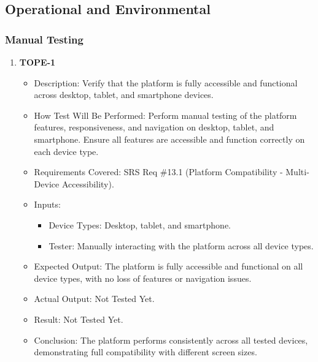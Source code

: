\documentclass[12pt, titlepage]{article}
\begin{document}
\subsection{Operational and Environmental}
\subsubsection{Manual Testing}
\begin{enumerate}
    \item \textbf{TOPE-1}  
    \begin{itemize}
        \item Description: Verify that the platform is fully accessible and functional across desktop, tablet, and smartphone devices.
        \item How Test Will Be Performed: Perform manual testing of the platform features, responsiveness, and navigation on desktop, tablet, and smartphone. Ensure all features are accessible and function correctly on each device type.
        \item Requirements Covered: SRS Req \#13.1 (Platform Compatibility - Multi-Device Accessibility).
        \item Inputs:  
            \begin{itemize}
                \item Device Types: Desktop, tablet, and smartphone.
                \item Tester: Manually interacting with the platform across all device types.
            \end{itemize}
        \item Expected Output: The platform is fully accessible and functional on all device types, with no loss of features or navigation issues.
        \item Actual Output: Not Tested Yet.
        \item Result: Not Tested Yet.
        \item Conclusion: The platform performs consistently across all tested devices, demonstrating full compatibility with different screen sizes.
    \end{itemize}


\end{enumerate}
\end{document}
